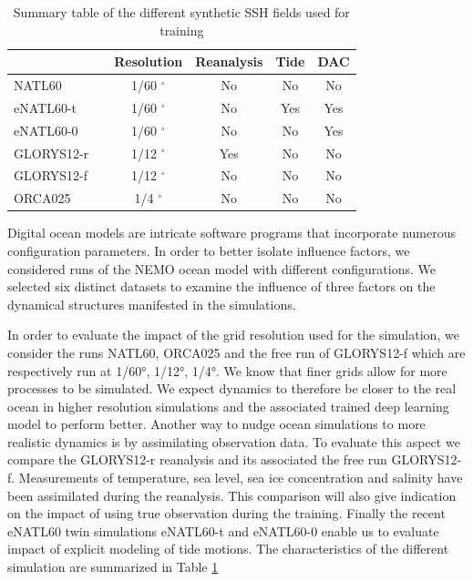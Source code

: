 \begin{bibunit}
\begin{table}[h]

\begin{tabular}{ll||cccc}
\toprule
{} & {}& Resolution & Reanalysis & Tide & DAC  \\
\midrule
NATL60 &\cite{ajayiSpatialTemporalVariability2020}               &      1/60 $^\circ$ &               No &            No &                   No  \\
eNATL60-t &\cite{brodeauOceannextENATL60Material2020}         &      1/60 $^\circ$ &               No &           Yes &                  Yes  \\
eNATL60-0 &\cite{brodeauOceannextENATL60Material2020}         &      1/60 $^\circ$ &               No &            No &                  Yes  \\
GLORYS12-r &\cite{jean-michelCopernicusGlobal122021} &      1/12 $^\circ$ &              Yes &            No &                   No  \\
GLORYS12-f &\cite{jean-michelCopernicusGlobal122021}   &      1/12 $^\circ$ &               No &            No &                   No  \\
ORCA025& \cite{bernardImpactPartialSteps2006}             &       1/4 $^\circ$ &               No &            No &                   No  \\
\bottomrule
\end{tabular}
\caption{Summary table of the different synthetic SSH fields used for training}
\label{tab:data}
\end{table}



Digital ocean models are intricate software programs that incorporate numerous configuration parameters. In order to better isolate influence factors, we considered runs of the NEMO\cite{gurvanNEMOOceanEngine2022} ocean model with different configurations. We selected six distinct datasets to examine the influence of three factors on the dynamical structures manifested in the simulations.

In order to evaluate the impact of the grid resolution used for the simulation, we consider the runs NATL60, ORCA025 and the free run of GLORYS12-f  which are respectively run at  1/60°, 1/12°, 1/4°. We know that finer grids allow for more processes to be simulated. We expect dynamics to therefore be closer to the real ocean in higher resolution simulations and the associated trained deep learning model to perform better.
Another way to nudge ocean simulations to more realistic dynamics is by assimilating observation data. To evaluate this aspect we compare the GLORYS12-r reanalysis and its associated the free run GLORYS12-f. Measurements of temperature, sea level, sea ice concentration and salinity have been assimilated during the reanalysis. This comparison will also give indication on the impact of using true observation during the training.
Finally the recent eNATL60 twin simulations  eNATL60-t and eNATL60-0 enable us to evaluate impact of explicit modeling of tide motions.
The characteristics of the different simulation are summarized in Table \ref{tab:data}


\end{bibunit}
